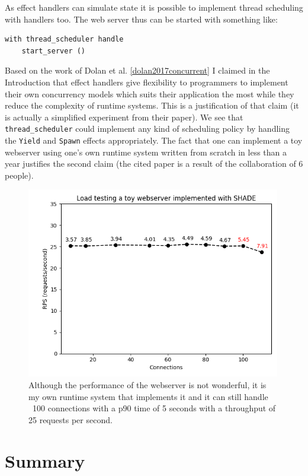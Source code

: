 \documentclass[class=article, crop=false]{standalone}
\begin{document}
As effect handlers can simulate state it is possible to implement thread
scheduling with handlers too. The web server
thus can be started with something like:
\begin{verbatim}
with thread_scheduler handle
    start_server ()
\end{verbatim}
Based on the work of Dolan et al. \autoref{dolan2017concurrent} I claimed in
the Introduction that effect handlers give flexibility to programmers to
implement their own concurrency models which suits their application the most
while they reduce the complexity of runtime systems. This is a justification of
that claim (it is actually a simplified experiment from their paper). We see
that \verb|thread_scheduler| could implement any kind of scheduling policy by
handling the \verb|Yield| and \verb|Spawn| effects appropriately. The fact that
one can implement a toy webserver using one's own runtime system written from
scratch in less than a year justifies the second claim (the cited paper is a
result of the collaboration of 6 people).

\begin{figure}
    \centering
    \includegraphics[width=30em]{eval_plots/webserver.png}
    \caption{Although the performance of the webserver is not wonderful, it is
    my own runtime system that implements it and it can still handle ~100
    connections with a p90 time of 5 seconds with a throughput of 25 requests
    per second.}
    \label{fig:hello-online-world}
\end{figure}

\section{Summary}
\end{document}
